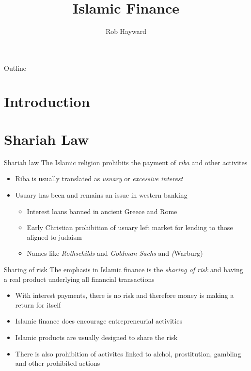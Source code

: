 \documentclass[14pt,xcolor=pdftex,dvipsnames,table]{beamer}\usepackage{graphicx, color}
\title{Islamic Finance}
\author{Rob Hayward}
\begin{document}
\begin{frame}
\titlepage
\end{frame}

\begin{frame}{Outline}
\tableofcontents
\end{frame}

\section{Introduction}


\section{Shariah Law}
\begin{frame}{Shariah law}
The Islamic religion prohibits the payment of \emph{riba} and other activites
\begin{itemize}
\item Riba is usually translated as \emph{usuary} or \emph{excessive interest}
\item Usuary has been and remains an issue in western banking
\begin{itemize}
\item Interest loans banned in ancient Greece and Rome
\item Early Christian prohibition of usuary left market for lending to those aligned to judaism 
\item Names like \emph{Rothschilds} and \emph{Goldman Sachs} and \emph(Warburg)
\end{itemize}
\end{itemize}
\end{frame}

\begin{frame}{Sharing of risk}
The emphasis in Islamic finance is the \emph{sharing of risk} and having a real product underlying all financial transactions
\begin{itemize}
\item With interest payments, there is no risk and therefore money is making a return for itself
\item Islamic finance does encourage entrepreneurial activities
\item Islamic products are usually designed to share the risk
\item There is also prohibition of activites linked to alchol, prostitution, gambling and other prohibited actions
\end{itemize}
\end{frame}
\end{document}
